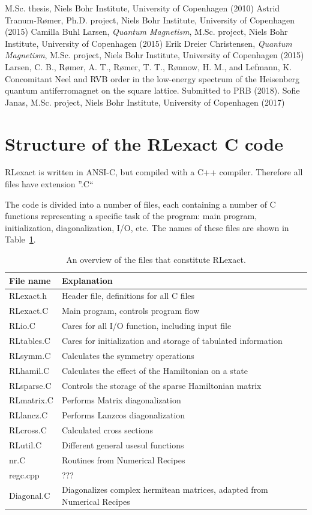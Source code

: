 \documentclass{article}
\begin{document}
\begin{thebibliography}{99}
M.Sc. thesis, Niels Bohr Institute, University of Copenhagen (2010)
 Astrid Tranum-R\o mer, 
Ph.D. project, Niels Bohr Institute, University of Copenhagen (2015)
 Camilla Buhl Larsen, 
{\em Quantum Magnetism}, 
M.Sc. project, Niels Bohr Institute, University of Copenhagen (2015)
 Erik Dreier Christensen, 
{\em Quantum Magnetism}, 
M.Sc. project, Niels Bohr Institute, University of Copenhagen (2015)
 Larsen, C. B., R\o mer, A. T., R\o mer, T. T., R\o nnow, H. M., and Lefmann, K. Concomitant Neel and RVB order in the low-energy spectrum of the Heisenberg quantum antiferromagnet on the square lattice. Submitted to PRB (2018).
 Sofie Janas, M.Sc. project, Niels Bohr Institute, University of Copenhagen (2017)
\end{thebibliography}

\newpage
\appendix
\section{Structure of the RLexact C code}
RLexact is written in ANSI-C, but compiled with a C++ compiler. Therefore all files have extension ''.C``

The code is divided into a number of files, each containing a number of C functions representing a specific task of the program: main program, initialization, diagonalization, I/O, etc. The names of these files are shown in Table~\ref{tab:files}.

\begin{table}
\begin{tabular}{|l|l|} \hline
File name & Explanation \\ \hline
RLexact.h & Header file, definitions for all C files  \\
RLexact.C & Main program, controls program flow \\
RLio.C & Cares for all I/O function, including input file  \\
RLtables.C & Cares for initialization and storage of tabulated information  \\
RLsymm.C & Calculates the symmetry operations \\
RLhamil.C & Calculates the effect of the Hamiltonian on a state \\
RLsparse.C & Controls the storage of the sparse Hamiltonian matrix \\
RLmatrix.C & Performs Matrix diagonalization \\
RLlancz.C & Performs Lanzcos diagonalization \\
RLcross.C & Calculated cross sections \\
RLutil.C & Different general usesul functions \\
nr.C & Routines from Numerical Recipes \\
regc.cpp & ??? \\
Diagonal.C & Diagonalizes complex hermitean matrices, adapted from Numerical Recipes \\
\hline
\end{tabular}
\caption{An overview of the files that constitute RLexact.} \label{tab:files}
\end{table}
\end{document}
